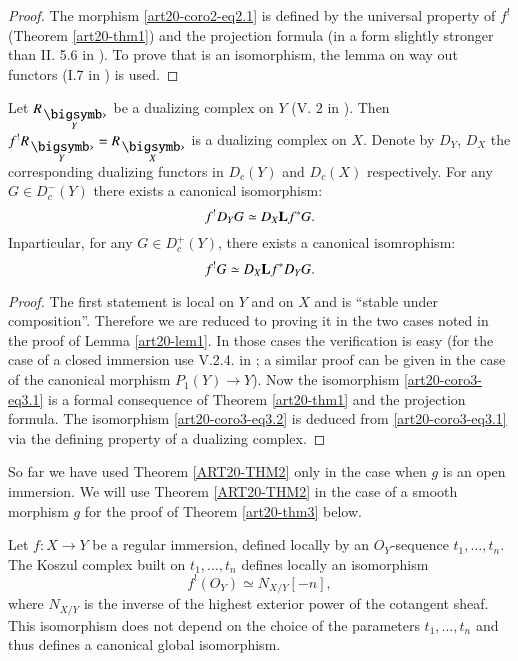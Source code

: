 \begin{proof}
The morphism \eqref{art20-coro2-eq2.1} is defined by the universal property of $f^{!}$ (Theorem \ref{art20-thm1}) and the projection formula (in a form slightly stronger than II. 5.6 in \cite{art20-key1}). To prove that is an isomorphism, the lemma on way out functors (I.7 in \cite{art20-key1}) is used.
\end{proof}

\begin{corollary}\label{art20-coro3}
Let $R_{\overdot{Y}}$ be a dualizing complex on $Y$ (V. $2$ in \cite{art20-key1}). Then $f^{!}R_{\overdot{Y}}=R_{\overdot{X}}$ is a dualizing complex on $X$. Denote by $D_{Y}$, $D_{X}$ the corresponding dualizing functors in $D_{c}(Y)$ and $D_{c}(X)$ respectively. For any $G\in D^{-}_{c}(Y)$ there exists a canonical isomorphism:
\setcounter{equation}{0}
\setcounter{section}{3}
\begin{equation}
f^{!}D_{Y}G\simeq D_{X}\mathbf{L} f^{*}G.\label{art20-coro3-eq3.1}
\end{equation}
In\pageoriginale particular, for any $G\in D^{+}_{c}(Y)$, there exists a canonical isomrophism:
\begin{equation}
f^{!}G\simeq D_{X}\mathbf{L} f^{*}D_{Y}G.\label{art20-coro3-eq3.2}
\end{equation}
\end{corollary}

\begin{proof}
The first statement is local on $Y$ and on $X$ and is ``stable under composition''. Therefore we are reduced to proving it in the two cases noted in the proof of Lemma \ref{art20-lem1}. In those cases the verification is easy (for the case of a closed immersion use V.2.4. in \cite{art20-key1}; a similar proof can be given in the case of the canonical morphism $P_{1}(Y)\to Y$). Now the isomorphism \eqref{art20-coro3-eq3.1} is a formal consequence of Theorem \ref{art20-thm1} and the projection formula. The isomorphism \eqref{art20-coro3-eq3.2} is deduced from \eqref{art20-coro3-eq3.1} via the defining property of a dualizing complex.
\end{proof}

So far we have used Theorem \ref{ART20-THM2} only in the case when $g$ is an open immersion. We will use Theorem \ref{ART20-THM2} in the case of a smooth morphism $g$ for the proof of Theorem \ref{art20-thm3} below.

\setcounter{proposition}{0}
\begin{proposition}\label{art20-sec2-prop1}
Let $f:X\to Y$ be a regular immersion, defined locally by an $O_{Y}$-sequence $t_{1},\ldots,t_{n}$. The Koszul complex built on $t_{1},\ldots,t_{n}$ defines locally an isomorphism
$$
f^{!}(O_{Y})\simeq N_{X/Y}[-n],
$$
where $N_{X/Y}$ is the inverse of the highest exterior power of the cotangent sheaf. This isomorphism does not depend on the choice of the parameters $t_{1},\ldots,t_{n}$ and thus defines a canonical global isomorphism.
\end{proposition}

